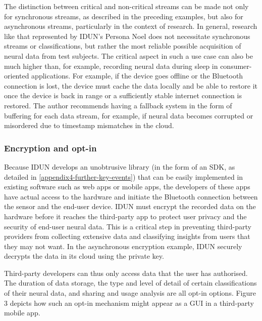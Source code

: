 The distinction between critical and non-critical streams can be made not only for synchronous streams, as described in the preceding examples, but also for asynchronous streams, particularly in the context of research. In general, research like that represented by IDUN's Persona Noel does not necessitate synchronous streams or classifications, but rather the most reliable possible acquisition of neural data from test subjects. The critical aspect in such a use case can also be much higher than, for example, recording neural data during sleep in consumer-oriented applications. For example, if the device goes offline or the Bluetooth connection is lost, the device must cache the data locally and be able to restore it once the device is back in range or a sufficiently stable internet connection is restored. The author recommends having a fallback system in the form of buffering for each data stream, for example, if neural data becomes corrupted or misordered due to timestamp mismatches in the cloud.


\subsubsection{Encryption and opt-in}
\label{chapter5-user-side-opt-in}

Because IDUN develops an unobtrusive library (in the form of an SDK, as detailed in \autoref{appendix4-further-key-events}) that can be easily implemented in existing software such as web apps or mobile apps, the developers of these apps have actual access to the hardware and initiate the Bluetooth connection between the sensor and the end-user device. IDUN must encrypt the recorded data on the hardware before it reaches the third-party app to protect user privacy and the security of end-user neural data. This is a critical step in preventing third-party providers from collecting extensive data and classifying insights from users that they may not want. In the asynchronous encryption example, IDUN securely decrypts the data in its cloud using the private key.


Third-party developers can thus only access data that the user has authorised. The duration of data storage, the type and level of detail of certain classifications of their neural data, and sharing and usage analysis are all opt-in options. Figure 3 depicts how such an opt-in mechanism might appear as a GUI in a third-party mobile app.

